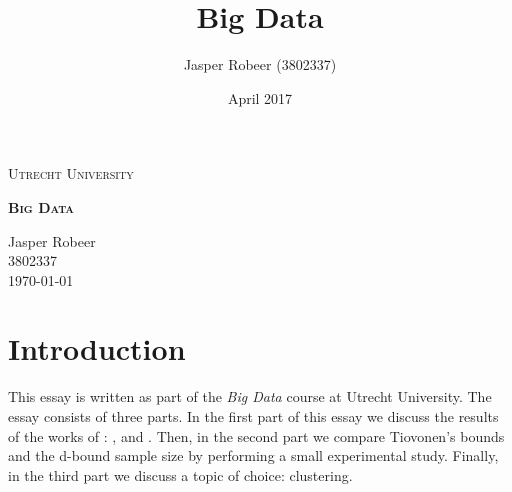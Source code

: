 \documentclass[11pt, a4paper]{article}
\title{Big Data}
\author{Jasper Robeer (3802337)}
\date{April 2017}
\newcommand*{\customtitle}{\begingroup
    \thispagestyle{empty}
    \vspace*{1.25in}
    \centering
    {\scshape \large Utrecht University} \\[0.5\baselineskip]
    {\scshape \bfseries \Huge Big Data \par}
    \vfill
    \raggedleft
    {Jasper Robeer \\ 3802337} \\[\baselineskip]
    {\today}
    \clearpage
\endgroup}
\begin{document}
\customtitle

\section*{Introduction}
\setcounter{section}{0}

This essay is written as part of the \emph{Big Data} course at Utrecht University.
The essay consists of three parts.
In the first part of this essay we discuss the results of the works of \citeauthor{Riondato2012}: , and .
Then, in the second part we compare Tiovonen's bounds and the d-bound sample size by performing a small experimental study.
Finally, in the third part we discuss a topic of choice: clustering.






\clearpage

\printbibliography
\end{document}

